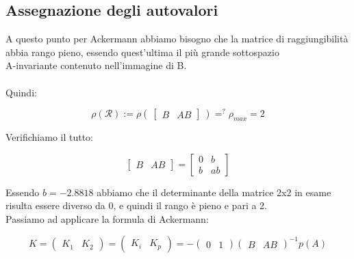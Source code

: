 \documentclass[a4paper,13pt]{article}
\begin{document}
\subsection{Assegnazione degli autovalori}
A questo punto per Ackermann abbiamo bisogno che la matrice di raggiungibilità abbia rango pieno, essendo quest'ultima 	il più grande sottospazio \\A-invariante contenuto nell'immagine di B.\\ \\
	Quindi:
	
\begin{equation*}
	\rho(\mathcal{R}):=
\rho(\:\begin{bmatrix}

	B&AB

\end{bmatrix}\:)=^{?}\rho_{max}=2
\end{equation*}

	Verifichiamo il tutto:
	
\begin{equation*}
\begin{bmatrix}

	B&AB

\end{bmatrix} =              %
\begin{bmatrix}

	0&b\\b&ab

\end{bmatrix}
\end{equation*}

	Essendo $b=-2.8818$ abbiamo che il determinante della matrice  2x2 in esame risulta essere diverso da 0,
	e quindi il rango è pieno e pari a 2.\\
	Passiamo ad applicare la formula di Ackermann:
	
\begin{equation*}                    %
	K=
\begin{pmatrix}

	K_{1}&K_{2}

\end{pmatrix} =						%
\begin{pmatrix}

	K_{i}&K_{p}						

\end{pmatrix} = -					%
\begin{pmatrix}

	0&1						

\end{pmatrix}
\begin{pmatrix}

	B&AB					

\end{pmatrix}^{-1}p(A)
\end{equation*} \\
\end{document}
